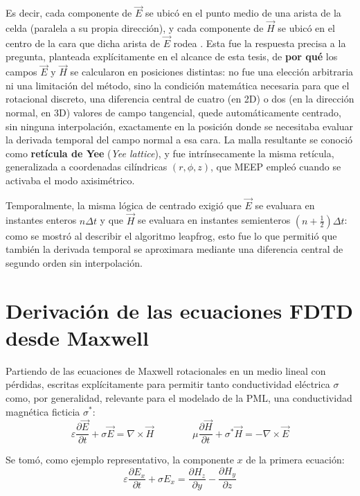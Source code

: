 Es decir, cada componente de $\vec{E}$ se ubicó en el punto medio de una arista de la celda (paralela a su propia dirección), y cada componente de $\vec{H}$ se ubicó en el centro de la cara que dicha arista de $\vec{E}$ rodea \cite{Yee1966}. Esta fue la respuesta precisa a la pregunta, planteada explícitamente en el alcance de esta tesis, de \textbf{por qué} los campos $\vec{E}$ y $\vec{H}$ se calcularon en posiciones distintas: no fue una elección arbitraria ni una limitación del método, sino la condición matemática necesaria para que el rotacional discreto, una diferencia central de cuatro (en 2D) o dos (en la dirección normal, en 3D) valores de campo tangencial, quede automáticamente centrado, sin ninguna interpolación, exactamente en la posición donde se necesitaba evaluar la derivada temporal del campo normal a esa cara. La malla resultante se conoció como \textbf{retícula de Yee} (\textit{Yee lattice}), y fue intrínsecamente la misma retícula, generalizada a coordenadas cilíndricas $(r, \phi, z)$, que MEEP empleó cuando se activaba el modo axisimétrico.

Temporalmente, la misma lógica de centrado exigió que $\vec{E}$ se evaluara en instantes enteros $n\Delta t$ y que $\vec{H}$ se evaluara en instantes semienteros $(n+\frac{1}{2})\Delta t$: como se mostró al describir el algoritmo leapfrog, esto fue lo que permitió que también la derivada temporal se aproximara mediante una diferencia central de segundo orden sin interpolación.

\section{Derivación de las ecuaciones FDTD desde Maxwell}
Partiendo de las ecuaciones de Maxwell rotacionales en un medio lineal con pérdidas, escritas explícitamente para permitir tanto conductividad eléctrica $\sigma$ como, por generalidad, relevante para el modelado de la PML, una conductividad magnética ficticia $\sigma^*$:
\begin{equation}
    \varepsilon\frac{\partial\vec{E}}{\partial t} + \sigma\vec{E} = \nabla\times\vec{H} \qquad\qquad \mu\frac{\partial\vec{H}}{\partial t} + \sigma^*\vec{H} = -\nabla\times\vec{E}
\end{equation}

Se tomó, como ejemplo representativo, la componente $x$ de la primera ecuación:
\begin{equation}
    \varepsilon\frac{\partial E_x}{\partial t} + \sigma E_x = \frac{\partial H_z}{\partial y} - \frac{\partial H_y}{\partial z}
\end{equation}

